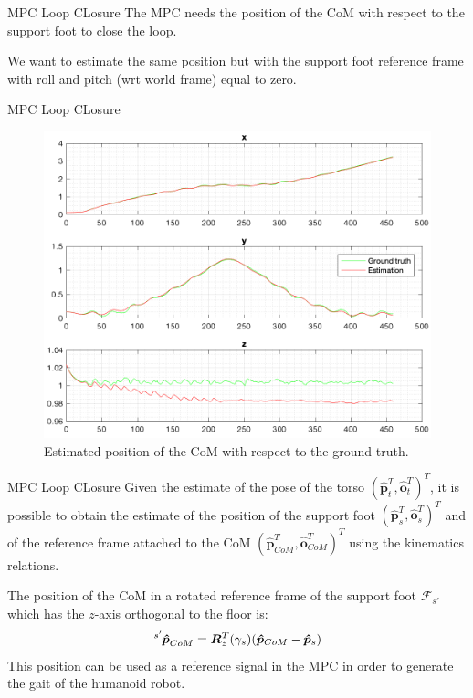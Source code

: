 \documentclass[10pt]{beamer}
\begin{document}
    \begin{frame}{MPC Loop CLosure}
        \justifying
    	The MPC needs the position of the CoM with respect to the support
        foot to close the loop.

    	We want to estimate the same position but with the support foot
        \mbox{reference} frame with roll and pitch (wrt world frame) equal to zero.
    \end{frame}

    \begin{frame}{MPC Loop CLosure}
    	\begin{figure}
            \caption{Estimated position of the CoM with respect to the
                ground truth.}
            \vspace{-0.3cm}
    	    \includegraphics[scale=0.5]{images/trilateration_com.png}
    	\end{figure}
    \end{frame}

    \begin{frame}{MPC Loop CLosure}
        \justifying
    	Given the estimate of the pose of the torso
        $(\bm{\hat{p}}_t^T, \bm{\hat{o}}_t^T)^T$,
        it is possible to obtain the estimate of the position of the support foot
        $(\bm{\hat{p}}_s^T, \bm{\hat{o}}_s^T)^T$  and of the reference frame
        attached to the CoM $(\bm{\hat{p}}_{CoM}^T, \bm{\hat{o}}_{CoM}^T)^T$  using the kinematics relations.

        The position of the CoM in a rotated
        reference frame of the support foot $\mathcal{F}_{s'}$ which has the $z$-axis
        orthogonal to the floor is:
        \begin{equation*}
            \tensor[^{s'}]{\bm{\hat{p}}}{_{CoM}} = \bm{R}^{T}_{z}(\gamma_s)(\bm{\hat{p}}_{CoM}-\bm{\hat{p}}_{s})
        \end{equation*}
        This position can be used as a reference signal
        in the MPC in order to generate the gait of the humanoid robot.
    \end{frame}
\end{document}
